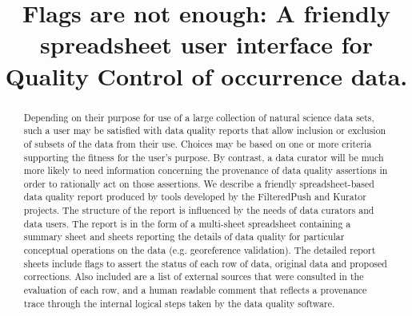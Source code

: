 \documentclass{article}
\begin{document}

\title{Flags are not enough: A friendly spreadsheet user interface for Quality Control of occurrence data.}
\date{\vspace{-5ex}} %
\maketitle
\begin{abstract}
Depending on their purpose for use of a large collection of natural science  data sets, such a user may be satisfied with data quality reports that allow inclusion or exclusion of subsets of the data from their use. Choices may be based on one or more criteria supporting the fitness for the user's purpose.  By contrast, a data curator will be much more likely to need  information concerning the provenance of data quality assertions in order to rationally act on those assertions.  We describe a friendly spreadsheet-based data quality report produced by tools developed by the FilteredPush and Kurator projects. The structure of the report is influenced by the needs of data curators and data users.  The report is in the form of a multi-sheet spreadsheet containing a summary sheet and sheets reporting the details of data quality for particular conceptual operations on the data (e.g. georeference validation).  The detailed report sheets include flags to assert the status of each row of data, original data and proposed corrections. Also included are a list of external sources that were consulted in the evaluation of each row, and a human readable comment that reflects a provenance trace through the internal logical steps taken by the data quality software.  
\end{abstract}
\end{document}
